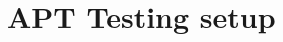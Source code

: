 \documentclass[../Main/thesis.tex]{subfiles}
\begin{document}
\chapter{APT Testing setup}%
\label{appendix:apt_testing}
\end{document}
